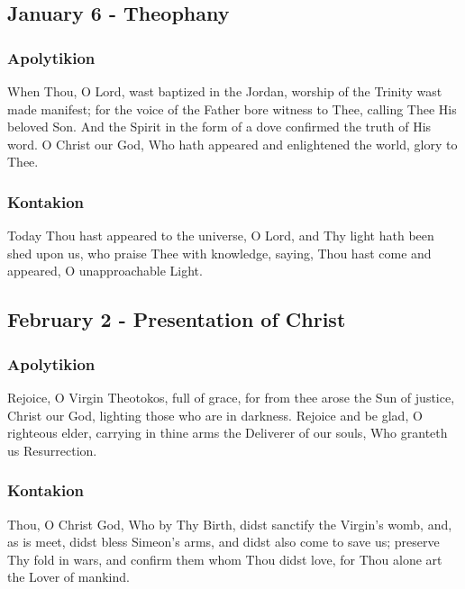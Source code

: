 \subsection{January 6 - Theophany}

\subsubsection{Apolytikion}

 When Thou, O Lord, wast baptized in the Jordan, worship of the Trinity wast made manifest; for the voice of the Father bore witness to Thee, calling Thee His beloved Son. And the Spirit in the form of a dove confirmed the truth of His word. O Christ our God, Who hath appeared and enlightened the world, glory to Thee.

\subsubsection{Kontakion}

 Today Thou hast appeared to the universe, O Lord, and Thy light hath been shed upon us, who praise Thee with knowledge, saying, Thou hast come and appeared, O unapproachable Light.

\subsection{February 2 - Presentation of Christ}

\subsubsection{Apolytikion}

 Rejoice, O Virgin Theotokos, full of grace, for from thee arose the Sun of justice, Christ our God, lighting those who are in darkness. Rejoice and be glad, O righteous elder, carrying in thine arms the Deliverer of our souls, Who granteth us Resurrection.

\subsubsection{Kontakion}

 Thou, O Christ God, Who by Thy Birth, didst sanctify the Virgin's womb, and, as is meet, didst bless Simeon's arms, and didst also come to save us; preserve Thy fold in wars, and confirm them whom Thou didst love, for Thou alone art the Lover of mankind.

